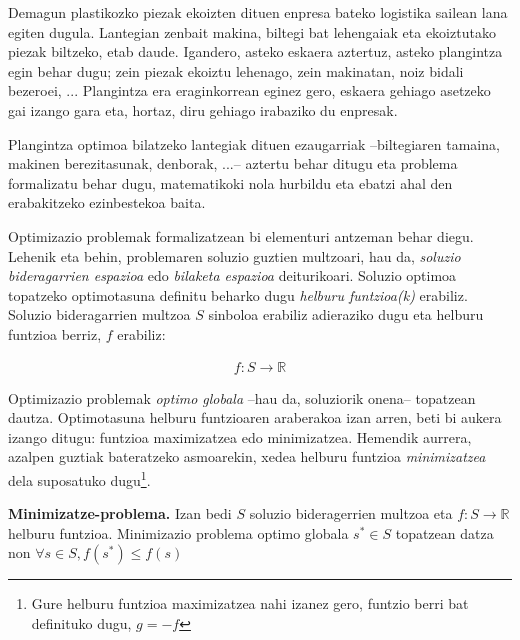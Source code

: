 \documentclass[eu]{ifirak}\usepackage[]{graphicx}\usepackage[]{color}
\begin{document}
\begin{tcolorbox}
\begin{ifexample}
Demagun plastikozko piezak ekoizten dituen enpresa bateko logistika sailean lana egiten dugula. Lantegian zenbait makina, biltegi bat lehengaiak eta ekoiztutako piezak biltzeko, etab daude. Igandero, asteko eskaera aztertuz, asteko plangintza egin behar dugu; zein piezak ekoiztu lehenago, zein makinatan, noiz bidali bezeroei, ... Plangintza era eraginkorrean eginez gero, eskaera gehiago asetzeko gai izango gara eta, hortaz, diru gehiago irabaziko du enpresak.

Plangintza optimoa bilatzeko lantegiak dituen ezaugarriak --biltegiaren tamaina, makinen berezitasunak, denborak, ...-- aztertu behar ditugu eta problema formalizatu behar dugu,  matematikoki nola hurbildu eta ebatzi ahal den erabakitzeko ezinbestekoa baita.

\end{ifexample}
\end{tcolorbox}

Optimizazio problemak formalizatzean bi elementuri antzeman behar diegu. Lehenik eta behin, problemaren soluzio guztien multzoari, hau da, \textit{soluzio bideragarrien espazioa} edo \textit{bilaketa espazioa} deiturikoari. Soluzio optimoa topatzeko optimotasuna definitu beharko dugu \textit{helburu funtzioa(k)} erabiliz. Soluzio bideragarrien multzoa $S$ sinboloa erabiliz adieraziko dugu eta helburu funtzioa berriz, $f$ erabiliz:

\begin{align*}
f: S \rightarrow \mathbb{R}
\end{align*}

Optimizazio problemak \textit{optimo globala} --hau da, soluziorik onena-- topatzean dautza. Optimotasuna helburu funtzioaren araberakoa izan arren, beti bi aukera izango ditugu: funtzioa maximizatzea edo minimizatzea. Hemendik aurrera, azalpen guztiak bateratzeko asmoarekin, xedea helburu funtzioa \textit{minimizatzea} dela suposatuko dugu\footnote{Gure helburu funtzioa maximizatzea nahi izanez gero, funtzio berri bat definituko dugu, $g=-f$}.

\begin{ifdefinition}
{\bf Minimizatze-problema.} Izan bedi $S$ soluzio bideragerrien multzoa eta $f: S \rightarrow \mathbb{R}$ helburu funtzioa. Minimizazio problema optimo globala $s^*\in S$ topatzean datza non $\forall s\in S, f(s^*)\leq f(s)$
\end{ifdefinition}
\end{document}
